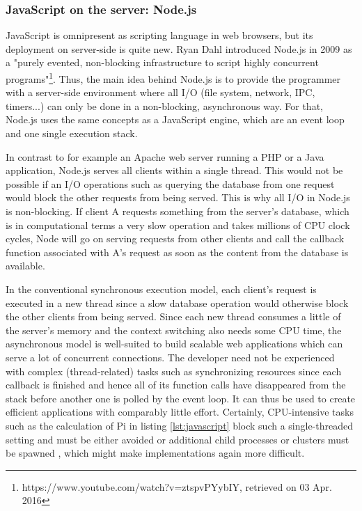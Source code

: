 \subsubsection{JavaScript on the server: Node.js}
\label{sub:sub:node}

JavaScript is omnipresent as scripting language in web browsers, but its deployment on server-side is quite new. Ryan Dahl introduced Node.js in 2009 as a "purely evented, non-blocking infrastructure to script highly concurrent programs"\footnote{https://www.youtube.com/watch?v=ztspvPYybIY, retrieved on 03 Apr. 2016}. Thus, the main idea behind Node.js is to provide the programmer with a server-side environment where all I/O (file system, network, IPC, timers...) can only be done in a non-blocking, asynchronous way. For that, Node.js uses the same concepts as a JavaScript engine, which are an event loop and one single execution stack.

In contrast to for example an Apache web server running a PHP or a Java application, Node.js serves all clients within a single thread. This would not be possible if an I/O operations such as querying the database from one request would block the other requests from being served. This is why all I/O in Node.js is non-blocking. If client A requests something from the server's database, which is in computational terms a very slow operation and takes millions of CPU clock cycles, Node will go on serving requests from other clients and call the callback function associated with A's request as soon as the content from the database is available. 

In the conventional synchronous execution model, each client's request is executed in a new thread since a slow database operation would otherwise block the other clients from being served. Since each new thread consumes a little of the server's memory and the context switching also needs some CPU time, the asynchronous model is well-suited to build scalable web applications which can serve a lot of concurrent connections. The developer need not be experienced with complex (thread-related) tasks such as synchronizing resources since each callback is finished and hence all of its function calls have disappeared from the stack before another one is polled by the event loop. It can thus be used to create efficient applications with comparably little effort. Certainly, CPU-intensive tasks such as the calculation of Pi in listing \ref{lst:javascript} block such a single-threaded setting and must be either avoided or additional child processes or clusters must be spawned \cite{nodedoc}, which might make implementations again more difficult.


